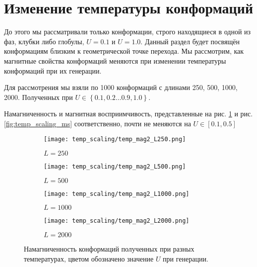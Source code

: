\section{Изменение температуры конформаций}
До этого мы рассматривали только конформации, строго находящиеся в одной из фаз, клубки либо глобулы, $U = 0.1$ и $U = 1.0$. Данный раздел будет посвящён конформациям близким к геометрической точке перехода. Мы рассмотрим, как магнитные свойства конформаций меняются при изменении температуры конформаций при их генерации. 

Для рассмотрения мы взяли по 1000 конформаций с длинами 250, 500, 1000, 2000. Полученных при $U \in \left\{0.1, 0.2 \dots 0.9, 1.0\right\}$.

Намагниченность и магнитная восприимчивость, представленные на рис. \ref{fig:temp_scaling_mag2} и рис. \ref{fig:temp_scaling_ms} соответственно, почти не меняются на  $U \in \left[0.1, 0.5\right]$

\begin{figure}[ht]
	\centering
    \begin{subfigure}[t]{0.4\textwidth}
        \texttt{[image: temp\_scaling/temp\_mag2\_L250.png]}
        \caption*{$L = 250$}
    \end{subfigure} 
    \begin{subfigure}[t]{0.4\textwidth}
        \texttt{[image: temp\_scaling/temp\_mag2\_L500.png]}
        \caption*{$L = 500$}

    \end{subfigure}
    \begin{subfigure}[t]{0.4\textwidth}
        \texttt{[image: temp\_scaling/temp\_mag2\_L1000.png]}
        \caption*{$L = 1000$}
    \end{subfigure}
    \begin{subfigure}[t]{0.4\textwidth}
        \texttt{[image: temp\_scaling/temp\_mag2\_L2000.png]}
        \caption*{$L = 2000$}
    \end{subfigure}
	\caption{Намагниченность конформаций полученных при разных температурах, цветом обозначено значение $U$ при генерации.}
	\label{fig:temp_scaling_mag2}
\end{figure}


